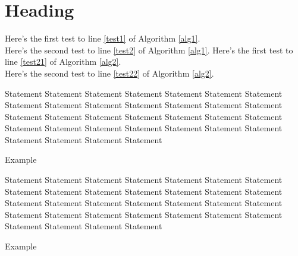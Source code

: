 \documentclass{book}
\begin{document}
\chapter{Heading}

Here's the first test to line \ref{test1} of Algorithm \ref{alg1}.\\
Here's the second test to line \ref{test2} of Algorithm \ref{alg1}.
Here's the first test to line \ref{test21} of Algorithm \ref{alg2}.\\
Here's the second test to line \ref{test22} of Algorithm \ref{alg2}.

\begin{algorithm}[p]
\begin{algorithmic}[1]
  \State Statement
    \State Statement
    \State Statement
    \State Statement    \label{test1}
    \State Statement
    \State Statement
    \State Statement
    \State Statement
    \State Statement
    \State Statement
    \State Statement
    \State Statement
    \State Statement
    \State Statement
    \State Statement
    \State Statement
    \State Statement
    \State Statement
    \State Statement
    \State Statement
    \State Statement
    \State Statement
    \State Statement
    \State Statement
    \State Statement
    \State Statement
    \State Statement
    \State Statement
    \State Statement
    \State Statement
    \State Statement    \label{test2}
    \State Statement
\end{algorithmic}
\caption{Example}
\label{alg1}
\end{algorithm}

\begin{algorithm}[p]
\begin{algorithmic}[1]
  \State Statement
    \State Statement
    \State Statement
    \State Statement    \label{test21}
    \State Statement
    \State Statement
    \State Statement
    \State Statement
    \State Statement
    \State Statement
    \State Statement
    \State Statement
    \State Statement
    \State Statement
    \State Statement
    \State Statement
    \State Statement
    \State Statement
    \State Statement
    \State Statement
    \State Statement
    \State Statement
    \State Statement
    \State Statement
    \State Statement
    \State Statement
    \State Statement
    \State Statement
    \State Statement
    \State Statement
    \State Statement    \label{test22}
    \State Statement
\end{algorithmic}
\caption{Example}
\label{alg2}
\end{algorithm}
\end{document}
